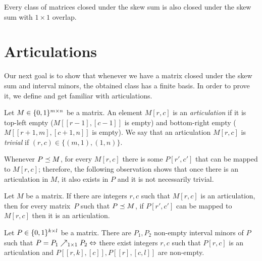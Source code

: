 \begin{obs}
\label{obs:0to1}
Every class of matrices closed under the skew sum is also closed under the skew sum with $1\times1$ overlap.
\end{obs}

\section{Articulations}
Our next goal is to show that whenever we have a matrix closed under the skew sum and interval minors, the obtained class has a finite basis. In order to prove it, we define and get familiar with articulations.

\begin{defn}
Let $M\in\{0,1\}^{m\times n}$ be a matrix. An element $M[r,c]$ is an \emph{articulation} if it is top-left empty ($M[[r-1],[c-1]]$ is empty) and bottom-right empty ($M[[r+1,m],[c+1,n]]$ is empty). We say that an articulation $M[r,c]$ is \emph{trivial} if $(r,c)\in\{(m,1),(1,n)\}$.
\end{defn}

Whenever $P\preceq M$, for every $M[r,c]$ there is some $P[r',c']$ that can be mapped to $M[r,c]$; therefore, the following observation shows that once there is an articulation in $M$, it also exists in $P$ and it is not necessarily trivial.

\begin{obs}
\label{obs:keep}
Let $M$ be a matrix. If there are integers $r,c$ such that $M[r,c]$ is an articulation, then for every matrix~$P$ such that $P\preceq M$, if $P[r',c']$ can be mapped to $M[r,c]$ then it is an articulation.
\end{obs}

\begin{obs}
\label{obs:art}
Let $P\in\{0,1\}^{k\times l}$ be a matrix. There are $P_1,P_2$ non-empty interval minors of $P$ such that $P=P_1\nearrow_{1\times1}P_2\Leftrightarrow$ there exist integers $r,c$ such that $P[r,c]$ is an articulation and $P[[r,k],[c]],P[[r],[c,l]]$ are non-empty.
\end{obs}

